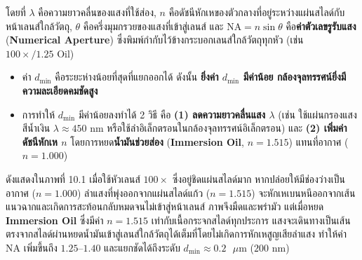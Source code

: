 โดยที่ $\lambda$ คือความยาวคลื่นของแสงที่ใช้ส่อง, $n$ คือดัชนีหักเหของตัวกลางที่อยู่ระหว่างแผ่นสไลด์กับหน้าเลนส์ใกล้วัตถุ, $\theta$ คือครึ่งมุมกรวยของแสงที่เข้าสู่เลนส์ และ $\text{NA} = n\sin\theta$ คือ\textbf{ค่าตัวเลขรูรับแสง} (\textbf{Numerical Aperture}) ซึ่งพิมพ์กำกับไว้ข้างกระบอกเลนส์ใกล้วัตถุทุกหัว (เช่น $100\times / 1.25\text{ Oil}$)

\begin{conceptbox}
\begin{itemize}
    \item ค่า $d_{\min}$ คือระยะห่างน้อยที่สุดที่แยกออกได้ ดังนั้น \textbf{ยิ่งค่า $d_{\min}$ มีค่าน้อย กล้องจุลทรรศน์ยิ่งมีความละเอียดคมชัดสูง}
    \item การทำให้ $d_{\min}$ มีค่าน้อยลงทำได้ 2 วิธี คือ \textbf{(1) ลดความยาวคลื่นแสง $\lambda$} (เช่น ใช้แผ่นกรองแสงสีน้ำเงิน $\lambda \approx 450\text{ nm}$ หรือใช้ลำอิเล็กตรอนในกล้องจุลทรรศน์อิเล็กตรอน) และ \textbf{(2) เพิ่มค่าดัชนีหักเห $n$} โดยการหยด\textbf{น้ำมันช่วยส่อง} (\textbf{Immersion Oil}, $n = 1.515$) แทนที่อากาศ ($n = 1.000$)
\end{itemize}
\end{conceptbox}

ดังแสดงใน\mbox{ภาพที่} 10.1 เมื่อใช้หัวเลนส์ $100\times$ ซึ่งอยู่ชิดแผ่นสไลด์มาก หากปล่อยให้มีช่องว่างเป็นอากาศ ($n = 1.000$) ลำแสงที่พุ่งออกจากแผ่นสไลด์แก้ว ($n = 1.515$) จะหักเหเบนหนีออกจากเส้นแนวฉากและเกิดการสะท้อนกลับหมดจนไม่เข้าสู่หน้าเลนส์ ภาพจึงมืดและพร่ามัว แต่เมื่อหยด \textbf{Immersion Oil} ซึ่งมีค่า $n = 1.515$ เท่ากับเนื้อกระจกสไลด์ทุกประการ แสงจะเดินทางเป็นเส้นตรงจากสไลด์ผ่านหยดน้ำมันเข้าสู่เลนส์ใกล้วัตถุได้เต็มที่โดยไม่เกิดการหักเหสูญเสียลำแสง ทำให้ค่า $\text{NA}$ เพิ่มขึ้นถึง $1.25\text{--}1.40$ และแยกชัดได้ถึงระดับ $d_{\min} \approx 0.2\text{ }\mu\text{m}$ ($200\text{ nm}$)

